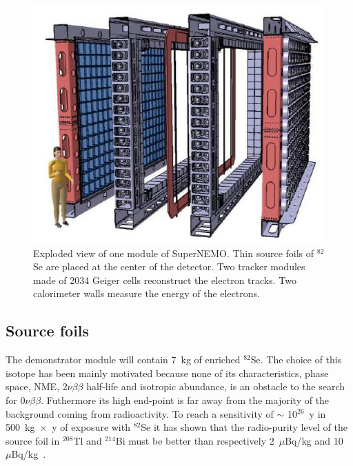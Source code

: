 \documentclass[main.tex]{subfiles}
\begin{document}
\begin{figure}[h!]
\begin{center}
\includegraphics[scale=0.65]{pictures/Chap3/snemomodule.png}
\caption{Exploded view of one module of SuperNEMO. Thin source foils of $^{\text{82}}$Se are placed at the center of the detector. Two tracker modules made of 2034 Geiger cells reconstruct the electron tracks. Two calorimeter walls measure the energy of the electrons.}
\label{SuperNEMOexplodedView}
\end{center}
\end{figure}


\FloatBarrier


\subsection{Source foils}\label{sec:SourceFoilsSN}


\NI The demonstrator module will contain 7~kg of enriched $^{\text{82}}$Se. The choice of this isotope has been mainly motivated because none of its characteristics, phase space, NME, 2$\nu\beta\beta$ half-life and isotropic abundance, is an obstacle to the search for 0$\nu\beta\beta$. Futhermore its high end-point is far away from the majority of the background coming from radioactivity. To reach a sensitivity of $\sim$ 10$^{\text{26}}$~y in 500~kg~$\times$~y of exposure with $^{\text{82}}$Se it has shown that the radio-purity level of the source foil in $^{\text{208}}$Tl and $^{\text{214}}$Bi must be better than respectively 2~$\mu$Bq/kg and 10~$\mu$Bq/kg~\cite{PhysicsCaseSuperNEMO}.
\end{document}
